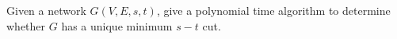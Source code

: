 \problem{}
Given a network $G(V, E, s, t)$, give a polynomial time algorithm to determine whether $G$ has a unique minimum $s-t$ cut.

\solution{}








\newpage